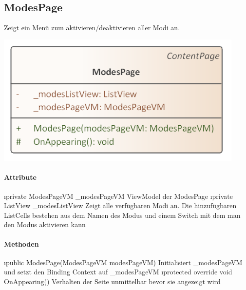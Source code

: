 \documentclass[../entwurf.tex]{subfiles}
\begin{document}
\subsection{ModesPage}
Zeigt ein Menü zum aktivieren/deaktivieren aller Modi an.
\begin{center}
	\includegraphics[page=1,width=350pt,keepaspectratio]{../uml_klassen/View/ModesPage.png}
\end{center}
\paragraph{Attribute}
\begin{itemize}
	\i{private ModesPageVM \_modesPageVM} ViewModel der ModesPage
	\i{private ListView \_modesListView} Zeigt alle verfügbaren Modi an. Die hinzufügbaren ListCells bestehen aus dem Namen des Modus und einem Switch mit dem man den Modus aktivieren kann
\end{itemize}

\paragraph{Methoden}

\begin{itemize}
	\i{public ModesPage(ModesPageVM modesPageVM)} Initialisiert \_modesPageVM und setzt den Binding Context 			auf \_modesPageVM
	\i{protected override void OnAppearing()} Verhalten der Seite unmittelbar bevor sie angezeigt wird
\end{itemize}
\end{document}
